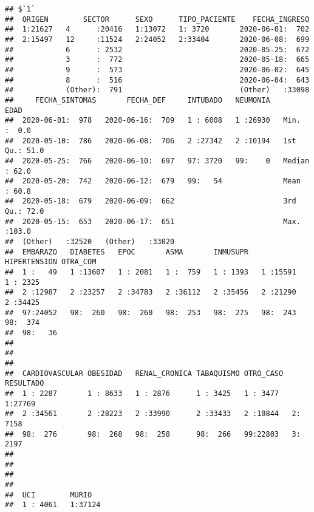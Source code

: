 \documentclass[]{article}
\begin{document}
\begin{verbatim}
## $`1`
##  ORIGEN        SECTOR      SEXO      TIPO_PACIENTE    FECHA_INGRESO  
##  1:21627   4      :20416   1:13072   1: 3720       2020-06-01:  702  
##  2:15497   12     :11524   2:24052   2:33404       2020-06-08:  699  
##            6      : 2532                           2020-05-25:  672  
##            3      :  772                           2020-05-18:  665  
##            9      :  573                           2020-06-02:  645  
##            8      :  516                           2020-06-04:  643  
##            (Other):  791                           (Other)   :33098  
##     FECHA_SINTOMAS       FECHA_DEF     INTUBADO   NEUMONIA        EDAD      
##  2020-06-01:  978   2020-06-16:  709   1 : 6008   1 :26930   Min.   :  0.0  
##  2020-05-10:  786   2020-06-08:  706   2 :27342   2 :10194   1st Qu.: 51.0  
##  2020-05-25:  766   2020-06-10:  697   97: 3720   99:    0   Median : 62.0  
##  2020-05-20:  742   2020-06-12:  679   99:   54              Mean   : 60.8  
##  2020-05-18:  679   2020-06-09:  662                         3rd Qu.: 72.0  
##  2020-05-15:  653   2020-06-17:  651                         Max.   :103.0  
##  (Other)   :32520   (Other)   :33020                                        
##  EMBARAZO   DIABETES   EPOC       ASMA       INMUSUPR   HIPERTENSION OTRA_COM  
##  1 :   49   1 :13607   1 : 2081   1 :  759   1 : 1393   1 :15591     1 : 2325  
##  2 :12987   2 :23257   2 :34783   2 :36112   2 :35456   2 :21290     2 :34425  
##  97:24052   98:  260   98:  260   98:  253   98:  275   98:  243     98:  374  
##  98:   36                                                                      
##                                                                                
##                                                                                
##                                                                                
##  CARDIOVASCULAR OBESIDAD   RENAL_CRONICA TABAQUISMO OTRO_CASO  RESULTADO
##  1 : 2287       1 : 8633   1 : 2876      1 : 3425   1 : 3477   1:27769  
##  2 :34561       2 :28223   2 :33990      2 :33433   2 :10844   2: 7158  
##  98:  276       98:  268   98:  258      98:  266   99:22803   3: 2197  
##                                                                         
##                                                                         
##                                                                         
##                                                                         
##  UCI        MURIO    
##  1 : 4061   1:37124  

\end{verbatim}
\end{document}
